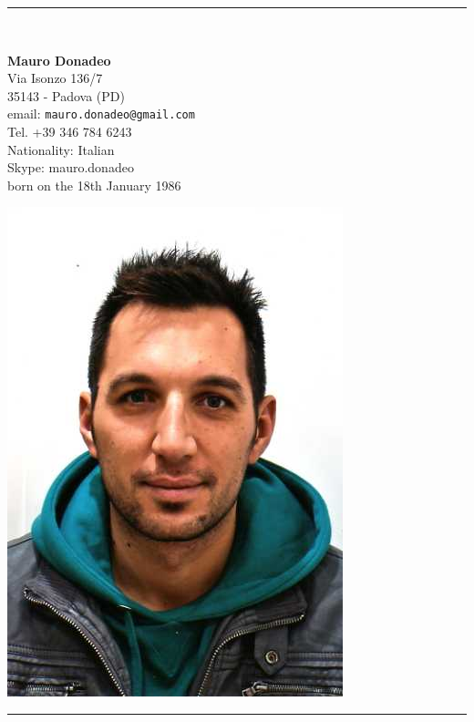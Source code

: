 \documentclass[pdftex,a4paper,10pt,twoside,titlepage]{article}
\begin{document}
\begin{center}
\rule{.8 \textwidth}{1pt}\\[5pt]
\begin{minipage}{.55\textwidth}
	\LARGE\textbf{Mauro Donadeo}\\[16pt]
	\footnotesize Via Isonzo 136/7 \\ 
	35143 - Padova (PD)\\
	email: \texttt{mauro.donadeo@gmail.com}\\
	\footnotesize {Tel. +39 346 784 6243}\\
	\footnotesize Nationality: Italian\\
	\footnotesize {Skype: mauro.donadeo}\\
	\footnotesize{born on the 18th January 1986}\\
\end{minipage}
\begin{minipage}{.25\textwidth}
	\includegraphics[width=\textwidth]{io.jpg}
\end{minipage}
\rule{.8 \textwidth}{1pt}\\[5pt]
\end{center}
\end{document}
